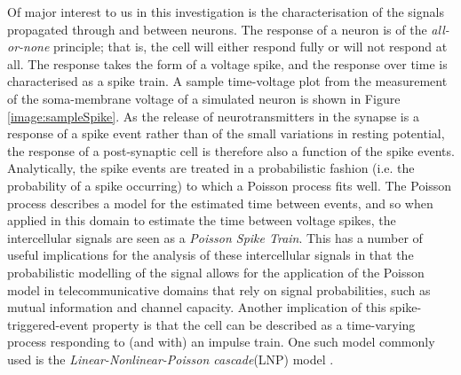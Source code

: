 Of major interest to us in this investigation is the characterisation of the signals propagated through and between neurons. The response of a neuron is of the \emph{all-or-none} principle; that is, the cell will either respond fully or will not respond at all. The response takes the form of a voltage spike, and the response over time is characterised as a spike train. A sample time-voltage plot from the measurement of the soma-membrane voltage of a simulated neuron is shown in Figure \ref{image:sampleSpike}. As the release of neurotransmitters in the synapse is a response of a spike event rather than of the small variations in resting potential, the response of a post-synaptic cell is therefore also a function of the spike events. Analytically, the spike events are treated in a probabilistic fashion (i.e. the probability of a spike occurring)  to which a Poisson process fits well. The Poisson process describes a model for the estimated time between events, and so when applied in this domain to estimate the time between voltage spikes, the intercellular signals are seen as a \emph{Poisson Spike Train}. This has a number of useful implications for the analysis of these intercellular signals in that the probabilistic modelling of the signal allows for the application of the Poisson model in telecommunicative domains that rely on signal probabilities, such as mutual information and channel capacity. Another implication of this spike-triggered-event property is that the cell can be described as a time-varying process responding to (and with) an impulse train. One such model commonly used is the \emph{Linear-Nonlinear-Poisson cascade}(LNP) model \cite{lnp}.
\par
